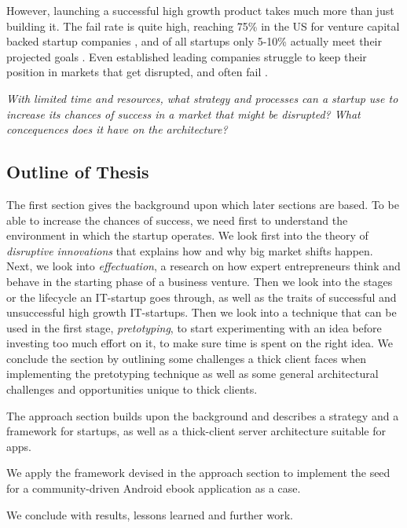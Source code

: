 \documentclass[a4paper,10pt]{article}
\begin{document}
However, launching a successful high growth product takes much more than just building it. The fail rate is quite high, 
reaching 75\% in the US for venture capital backed startup companies \cite{pressArticleStartupsFailure75percent}, and of all startups only 5-10\% 
actually meet their projected goals \cite{pressArticleStartupsFailureUpTo95percent}. Even established leading companies 
struggle to keep their position in markets that get disrupted, and often fail \cite{innovatorsSolution}. 	

\emph{With limited time and resources, what strategy and processes can a startup use to increase its chances of success in a market 
 that might be disrupted? 
 What concequences does it have on the architecture?} 

\subsection{Outline of Thesis}
The first section gives the background upon which later sections are based. 
To be able to increase the chances of success, we need first to understand the environment in which the startup operates. 
We look first into the theory of \emph{disruptive innovations} that explains how and why big market shifts happen.
Next, we look into \emph{effectuation}, a research on how expert entrepreneurs think and behave in the starting phase of a business venture.
Then we look into the stages or the lifecycle an IT-startup goes through, as well as the traits of successful and unsuccessful high growth IT-startups. 
Then we look into a technique that can be used in the first stage, \emph{pretotyping}, to start experimenting with an idea before 
investing too much effort on it, to make sure time is spent on the right idea.
We conclude the section by outlining some challenges a thick client faces when implementing the pretotyping technique 
as well as some general architectural challenges and opportunities unique to thick clients.

The approach section builds upon the background and describes a strategy and a framework for startups, 
as well as a thick-client server architecture suitable for apps. 

We apply the framework devised in the approach section to implement the seed for a community-driven Android ebook application as a case. 

We conclude with results, lessons learned and further work.

\end{document}
